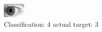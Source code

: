 \begin{figure}[h!]
\begin{center}
\includegraphics[width=0.60\columnwidth]{figures/ID282_class_4_target_3.png}
\end{center}
\caption{ Classification: 4 actual target: 3}
\label{fig:ID282_class_4_target_3}
\end{figure}
